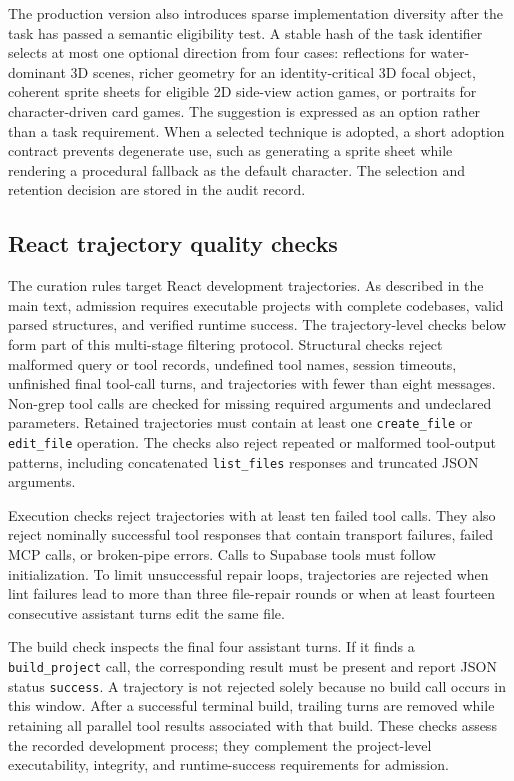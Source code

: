 \documentclass{article}
\begin{document}
The production version also introduces sparse implementation diversity after the task has passed a semantic eligibility test. A stable hash of the task identifier selects at most one optional direction from four cases: reflections for water-dominant 3D scenes, richer geometry for an identity-critical 3D focal object, coherent sprite sheets for eligible 2D side-view action games, or portraits for character-driven card games. The suggestion is expressed as an option rather than a task requirement. When a selected technique is adopted, a short adoption contract prevents degenerate use, such as generating a sprite sheet while rendering a procedural fallback as the default character. The selection and retention decision are stored in the audit record.

\subsection{React trajectory quality checks}
\label{app:react_quality_checks}

The curation rules target React development trajectories. As described in the main text, admission requires executable projects with complete codebases, valid parsed structures, and verified runtime success. The trajectory-level checks below form part of this multi-stage filtering protocol. Structural checks reject malformed query or tool records, undefined tool names, session timeouts, unfinished final tool-call turns, and trajectories with fewer than eight messages. Non-grep tool calls are checked for missing required arguments and undeclared parameters. Retained trajectories must contain at least one \texttt{create\_file} or \texttt{edit\_file} operation. The checks also reject repeated or malformed tool-output patterns, including concatenated \texttt{list\_files} responses and truncated JSON arguments.

Execution checks reject trajectories with at least ten failed tool calls. They also reject nominally successful tool responses that contain transport failures, failed MCP calls, or broken-pipe errors. Calls to Supabase tools must follow initialization. To limit unsuccessful repair loops, trajectories are rejected when lint failures lead to more than three file-repair rounds or when at least fourteen consecutive assistant turns edit the same file.

The build check inspects the final four assistant turns. If it finds a \texttt{build\_project} call, the corresponding result must be present and report JSON status \texttt{success}. A trajectory is not rejected solely because no build call occurs in this window. After a successful terminal build, trailing turns are removed while retaining all parallel tool results associated with that build. These checks assess the recorded development process; they complement the project-level executability, integrity, and runtime-success requirements for admission.
\end{document}

